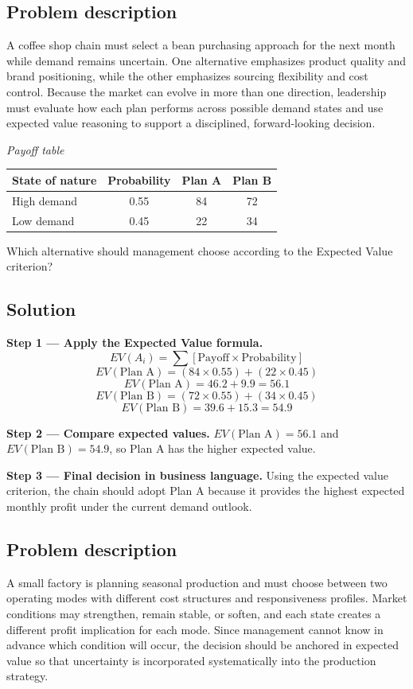 \begin{ExamProblems}
		\subsection*{Problem description}
		A coffee shop chain must select a bean purchasing approach for the next month while demand remains uncertain. One alternative emphasizes product quality and brand positioning, while the other emphasizes sourcing flexibility and cost control. Because the market can evolve in more than one direction, leadership must evaluate how each plan performs across possible demand states and use expected value reasoning to support a disciplined, forward-looking decision.

		\begin{center}
			\textit{Payoff table} \par
			\begin{tabular}{l c c c}
				\toprule
				State of nature & Probability & Plan A & Plan B \\
				\midrule
				High demand & 0.55 & 84 & 72 \\
				Low demand & 0.45 & 22 & 34 \\
				\bottomrule
			\end{tabular}
		\end{center}

		Which alternative should management choose according to the Expected Value criterion?

		\subsection*{Solution}
		\textbf{Step 1 --- Apply the Expected Value formula.}
		\[
		EV(A_i)=\sum [\text{Payoff}\times\text{Probability}]
		\]
		\[
		EV(\text{Plan A})=(84\times0.55)+(22\times0.45)
		\]
		\[
		EV(\text{Plan A})=46.2+9.9=56.1
		\]
		\[
		EV(\text{Plan B})=(72\times0.55)+(34\times0.45)
		\]
		\[
		EV(\text{Plan B})=39.6+15.3=54.9
		\]
		
		\textbf{Step 2 --- Compare expected values.}
		$EV(\text{Plan A})=56.1$ and $EV(\text{Plan B})=54.9$, so Plan A has the higher expected value.
		
		\textbf{Step 3 --- Final decision in business language.}
		Using the expected value criterion, the chain should adopt Plan A because it provides the highest expected monthly profit under the current demand outlook.		\item
		\subsection*{Problem description}
		A small factory is planning seasonal production and must choose between two operating modes with different cost structures and responsiveness profiles. Market conditions may strengthen, remain stable, or soften, and each state creates a different profit implication for each mode. Since management cannot know in advance which condition will occur, the decision should be anchored in expected value so that uncertainty is incorporated systematically into the production strategy.


\end{ExamProblems}
